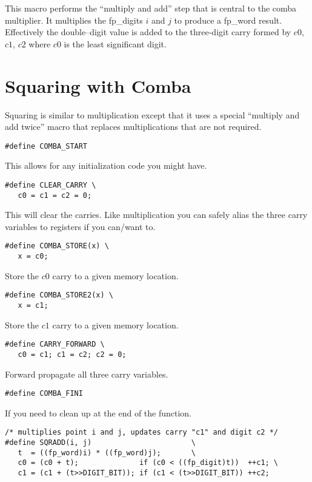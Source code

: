 \documentclass[b5paper]{book}
\begin{document}
This macro performs the ``multiply and add'' step that is central to the comba
multiplier.  It multiplies the fp\_digits $i$ and $j$ to produce a fp\_word result.  Effectively
the double--digit value is added to the three-digit carry formed by $c0$, $c1$, $c2$ where $c0$
is the least significant digit.

\section{Squaring with Comba}
Squaring is similar to multiplication except that it uses a special ``multiply and add twice'' macro
that replaces multiplications that are not required.

\begin{verbatim}
#define COMBA_START
\end{verbatim}

This allows for any initialization code you might have.  

\begin{verbatim}
#define CLEAR_CARRY \
   c0 = c1 = c2 = 0;
\end{verbatim}

This will clear the carries.  Like multiplication you can safely alias the three carry variables
to registers if you can/want to.

\begin{verbatim}
#define COMBA_STORE(x) \
   x = c0;
\end{verbatim}

Store the $c0$ carry to a given memory location.

\begin{verbatim}
#define COMBA_STORE2(x) \
   x = c1;
\end{verbatim}

Store the $c1$ carry to a given memory location.

\begin{verbatim}
#define CARRY_FORWARD \
   c0 = c1; c1 = c2; c2 = 0;
\end{verbatim}

Forward propagate all three carry variables.

\begin{verbatim}
#define COMBA_FINI
\end{verbatim}

If you need to clean up at the end of the function.

\begin{verbatim}
/* multiplies point i and j, updates carry "c1" and digit c2 */
#define SQRADD(i, j)                       \
   t  = ((fp_word)i) * ((fp_word)j);       \
   c0 = (c0 + t);              if (c0 < ((fp_digit)t))  ++c1; \
   c1 = (c1 + (t>>DIGIT_BIT)); if (c1 < (t>>DIGIT_BIT)) ++c2; 
\end{verbatim}
\end{document}
